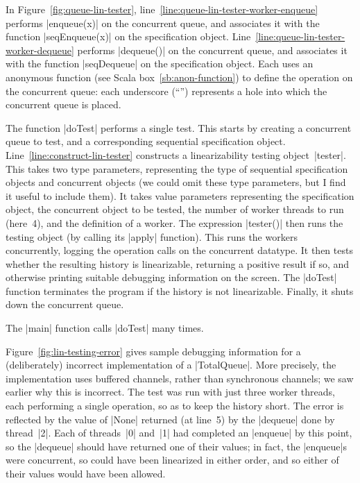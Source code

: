 In Figure~\ref{fig:queue-lin-tester},
line~\ref{line:queue-lin-tester-worker-enqueue} performs |enqueue(x)| on the
concurrent queue, and associates it with the function |seqEnqueue(x)| on the
specification object.  Line~\ref{line:queue-lin-tester-worker-dequeue}
performs |dequeue()| on the concurrent queue, and associates it with the
function |seqDequeue| on the specification object.  Each uses an anonymous
function (see Scala box~\ref{sb:anon-function}) to define the operation on the
concurrent queue: each underscore (``\SCALA{_}'') represents a hole into which
the concurrent queue is placed.

The function |doTest| performs a single test.  This starts by creating a
concurrent queue to test, and a corresponding sequential specification object.
Line~\ref{line:construct-lin-tester} constructs a linearizability testing
object~|tester|.  This takes two type parameters, representing the type of
sequential specification objects and concurrent objects (we could omit these
type parameters, but I find it useful to include them).  It takes value
parameters representing the specification object, the concurrent object to be
tested, the number of worker threads to run (here~4), and the definition of a
worker.
%
The expression |tester()| then runs the testing object (by calling its |apply|
function).  This runs the workers concurrently, logging the operation calls on
the concurrent datatype.  It then tests whether the resulting history is
linearizable, returning a positive result if so, and otherwise printing
suitable debugging information on the screen.  The |doTest| function
terminates the program if the history is not linearizable.  Finally, it shuts
down the concurrent queue.

The |main| function calls |doTest| many times. 

Figure~\ref{fig:lin-testing-error} gives sample debugging information for a
(deliberately) incorrect implementation of a |TotalQueue|.  More precisely,
the implementation uses buffered channels, rather than synchronous channels;
we saw earlier why this is incorrect.  The test was run with just three worker
threads, each performing a single operation, so as to keep the history short.
The error is reflected by the value of |None| returned (at line~5) by the
|dequeue| done by thread~|2|.  Each of threads~|0| and~|1| had completed an
|enqueue| by this point, so the |dequeue| should have returned one of their
values; in fact, the |enqueue|s were concurrent, so could have been linearized
in either order, and so either of their values would have been allowed.


